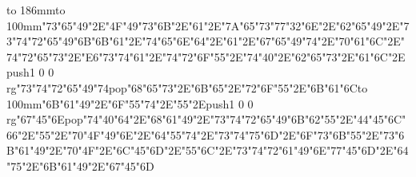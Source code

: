 \hbox to 186mm{\hsize=81mm\vbox to 100mm{\vfill\ipa\char"73\ipa\char"65\ipa\char"49\ipa\char"2E\ipa\char"4F\ipa\char"49\ipa\char"73\ipa\char"6B\ipa\char"2E\ipa\char"61\ipa\char"2E\ipa\char"7A\ipa\char"65\ipa\char"73\medskip\ipa\char"77\ipa\char"32\ipa\char"6E\ipa\char"2E\ipa\char"62\ipa\char"65\ipa\char"49\ipa\char"2E\ipa\char"73\ipa\char"74\ipa\char"72\ipa\char"65\ipa\char"49\ipa\char"6B\medskip\ipa\char"6B\ipa\char"61\ipa\char"2E\ipa\char"74\ipa\char"65\ipa\char"6E\ipa\char"64\ipa\char"2E\ipa\char"61\ipa\char"2E\ipa\char"67\ipa\char"65\ipa\char"49\ipa\char"74\ipa\char"2E\ipa\char"70\ipa\char"61\ipa\char"6C\ipa\char"2E\ipa\char"74\ipa\char"72\ipa\char"65\ipa\char"73\ipa\char"2E\ipa\char"E6\ipa\char"73\ipa\char"74\medskip\ipa\char"61\ipa\char"2E\ipa\char"74\ipa\char"72\ipa\char"6F\ipa\char"55\ipa\char"2E\ipa\char"74\ipa\char"40\ipa\char"2E\ipa\char"62\ipa\char"65\ipa\char"73\ipa\char"2E\ipa\char"61\ipa\char"6C\ipa\char"2E\pdfcolorstack\match push{1 0 0 rg}\ipa\char"73\ipa\char"74\ipa\char"72\ipa\char"65\ipa\char"49\ipa\char"74\pdfcolorstack\match pop{}\medskip\ipa\char"68\ipa\char"65\ipa\char"73\ipa\char"2E\ipa\char"6B\ipa\char"65\ipa\char"2E\ipa\char"72\ipa\char"6F\ipa\char"55\ipa\char"2E\ipa\char"6B\ipa\char"61\ipa\char"6C\vfill}\hfill\vbox to 100mm{\vfill\ipa\char"6B\ipa\char"61\ipa\char"49\ipa\char"2E\ipa\char"6F\ipa\char"55\ipa\char"74\ipa\char"2E\ipa\char"55\ipa\char"2E\pdfcolorstack\match push{1 0 0 rg}\ipa\char"67\ipa\char"45\ipa\char"6E\pdfcolorstack\match pop{}\medskip\ipa\char"74\ipa\char"40\ipa\char"64\ipa\char"2E\ipa\char"68\ipa\char"61\ipa\char"49\ipa\char"2E\ipa\char"73\ipa\char"74\ipa\char"72\ipa\char"65\ipa\char"49\ipa\char"6B\medskip\ipa\char"62\ipa\char"55\ipa\char"2E\ipa\char"44\ipa\char"45\ipa\char"6C\ipa\char"66\ipa\char"2E\ipa\char"55\ipa\char"2E\ipa\char"70\ipa\char"4F\ipa\char"49\ipa\char"6E\ipa\char"2E\ipa\char"64\ipa\char"55\ipa\char"74\ipa\char"2E\ipa\char"73\ipa\char"74\ipa\char"75\ipa\char"6D\ipa\char"2E\ipa\char"6F\ipa\char"73\ipa\char"6B\medskip\ipa\char"55\ipa\char"2E\ipa\char"73\ipa\char"6B\ipa\char"61\ipa\char"49\ipa\char"2E\ipa\char"70\ipa\char"4F\ipa\char"2E\ipa\char"6C\ipa\char"45\ipa\char"6D\ipa\char"2E\ipa\char"55\ipa\char"6C\ipa\char"2E\ipa\char"73\ipa\char"74\ipa\char"72\ipa\char"61\ipa\char"49\ipa\char"6E\medskip\ipa\char"77\ipa\char"45\ipa\char"6D\ipa\char"2E\ipa\char"64\ipa\char"75\ipa\char"2E\ipa\char"6B\ipa\char"61\ipa\char"49\ipa\char"2E\ipa\char"67\ipa\char"45\ipa\char"6D\vfill}}\eject
